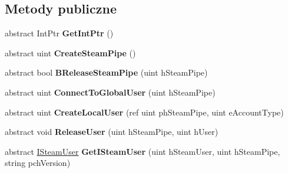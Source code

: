 \subsection*{Metody publiczne}
\begin{DoxyCompactItemize}
\item 
\mbox{\label{class_valve_1_1_steamworks_1_1_i_steam_client_a89f2b94b10fb162175b201dbc8b5ae1a}} 
abstract Int\+Ptr {\bfseries Get\+Int\+Ptr} ()
\item 
\mbox{\label{class_valve_1_1_steamworks_1_1_i_steam_client_aa101a23fe8850a35815ea18579e5d393}} 
abstract uint {\bfseries Create\+Steam\+Pipe} ()
\item 
\mbox{\label{class_valve_1_1_steamworks_1_1_i_steam_client_a9ff5cf21692d028cebe85e8ca5daacf9}} 
abstract bool {\bfseries B\+Release\+Steam\+Pipe} (uint h\+Steam\+Pipe)
\item 
\mbox{\label{class_valve_1_1_steamworks_1_1_i_steam_client_a3c4201b27b18b35eff16a2d11173f0ad}} 
abstract uint {\bfseries Connect\+To\+Global\+User} (uint h\+Steam\+Pipe)
\item 
\mbox{\label{class_valve_1_1_steamworks_1_1_i_steam_client_aeaee1708f23069b6fddfc5625ec17c4d}} 
abstract uint {\bfseries Create\+Local\+User} (ref uint ph\+Steam\+Pipe, uint e\+Account\+Type)
\item 
\mbox{\label{class_valve_1_1_steamworks_1_1_i_steam_client_ac6b5a8ef96593b68ddaa20727c47b1c7}} 
abstract void {\bfseries Release\+User} (uint h\+Steam\+Pipe, uint h\+User)
\item 
\mbox{\label{class_valve_1_1_steamworks_1_1_i_steam_client_abb0b1a376f182532b967e1ae6f4439f1}} 
abstract \hyperlink{class_valve_1_1_steamworks_1_1_i_steam_user}{I\+Steam\+User} {\bfseries Get\+I\+Steam\+User} (uint h\+Steam\+User, uint h\+Steam\+Pipe, string pch\+Version)
\item 
\mbox{\label{class_valve_1_1_steamworks_1_1_i_steam_client_ac00b1c3b645f5c0a03ebeba28ccd4262}} 

\end{DoxyCompactItemize}
